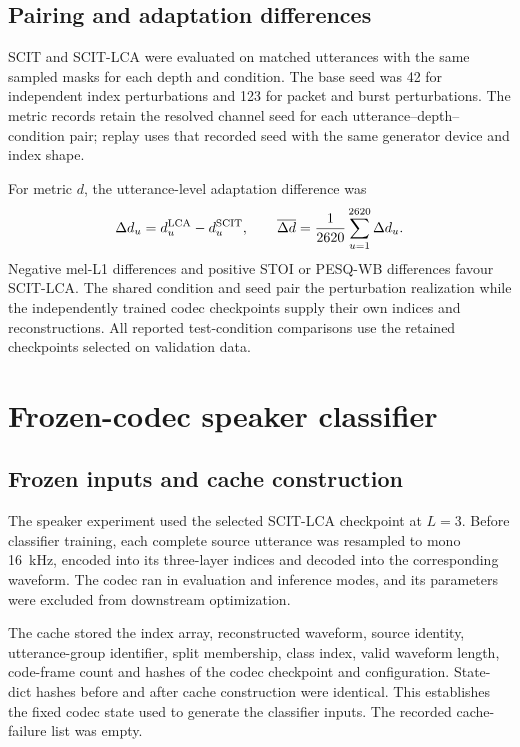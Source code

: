 \subsection{Pairing and adaptation differences}
SCIT and SCIT-LCA were evaluated on matched utterances with the same sampled masks for each depth and condition. The base seed was 42 for independent index perturbations and 123 for packet and burst perturbations. The metric records retain the resolved channel seed for each utterance--depth--condition pair; replay uses that recorded seed with the same generator device and index shape.

For metric $d$, the utterance-level adaptation difference was
\begin{equation}
 \Delta d_u=d_u^{\rm LCA}-d_u^{\rm SCIT},
 \qquad
 \overline{\Delta d}=\frac{1}{2620}\sum_{u=1}^{2620}\Delta d_u.
 \label{eq:sv2-paired}
\end{equation}
Negative mel-L1 differences and positive STOI or PESQ-WB differences favour SCIT-LCA. The shared condition and seed pair the perturbation realization while the independently trained codec checkpoints supply their own indices and reconstructions. All reported test-condition comparisons use the retained checkpoints selected on validation data.

\section{Frozen-codec speaker classifier}
\label{sec:sv2-speaker}

\subsection{Frozen inputs and cache construction}
The speaker experiment used the selected SCIT-LCA checkpoint at $L=3$. Before classifier training, each complete source utterance was resampled to mono 16~kHz, encoded into its three-layer indices and decoded into the corresponding waveform. The codec ran in evaluation and inference modes, and its parameters were excluded from downstream optimization.

The cache stored the index array, reconstructed waveform, source identity, utterance-group identifier, split membership, class index, valid waveform length, code-frame count and hashes of the codec checkpoint and configuration. State-dict hashes before and after cache construction were identical. This establishes the fixed codec state used to generate the classifier inputs. The recorded cache-failure list was empty.


